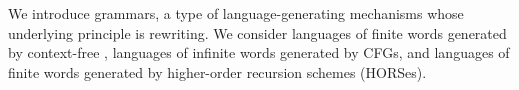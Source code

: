 \documentclass[../../diss.tex]{subfiles}
\begin{document}
We introduce grammars, a type of language-generating mechanisms whose underlying principle is rewriting.
We consider languages of finite words generated by context-free , languages of infinite words generated by CFGs, and languages of finite words generated by higher-order recursion schemes (HORSes).
\end{document}

